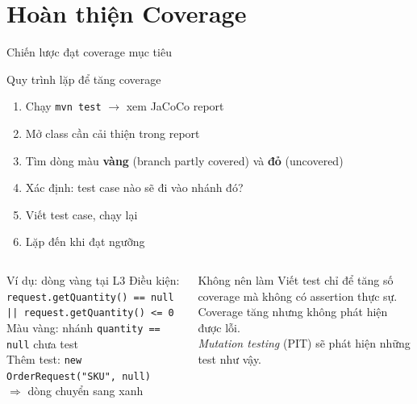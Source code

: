 \documentclass[aspectratio=169,10pt]{beamer}
\begin{document}
\section{Hoàn thiện Coverage}

\begin{frame}[shrink=20]{Chiến lược đạt coverage mục tiêu}
  \begin{block}{Quy trình lặp để tăng coverage}
    \begin{enumerate}
      \item Chạy \texttt{mvn test} $\to$ xem JaCoCo report
      \item Mở class cần cải thiện trong report
      \item Tìm dòng màu \textbf{vàng} (branch partly covered) và \textbf{đỏ} (uncovered)
      \item Xác định: test case nào sẽ đi vào nhánh đó?
      \item Viết test case, chạy lại
      \item Lặp đến khi đạt ngưỡng
    \end{enumerate}
  \end{block}

  \vspace{0.3em}
  \begin{columns}
    \begin{exampleblock}{Ví dụ: dòng vàng tại L3}
      Điều kiện: \texttt{request.getQuantity() == null || request.getQuantity() <= 0}\\[0.3em]
      Màu vàng: nhánh \texttt{quantity == null} chưa test\\[0.3em]
      Thêm test: \texttt{new OrderRequest("SKU", null)}\\
      $\Rightarrow$ dòng chuyển sang xanh
    \end{exampleblock}

    \begin{alertblock}{Không nên làm}
      Viết test chỉ để tăng số coverage mà không có assertion thực sự.
      Coverage tăng nhưng không phát hiện được lỗi.\\[0.3em]
      \textit{Mutation testing} (PIT) sẽ phát hiện
      những test như vậy.
    \end{alertblock}
  \end{columns}
\end{frame}
\end{document}
